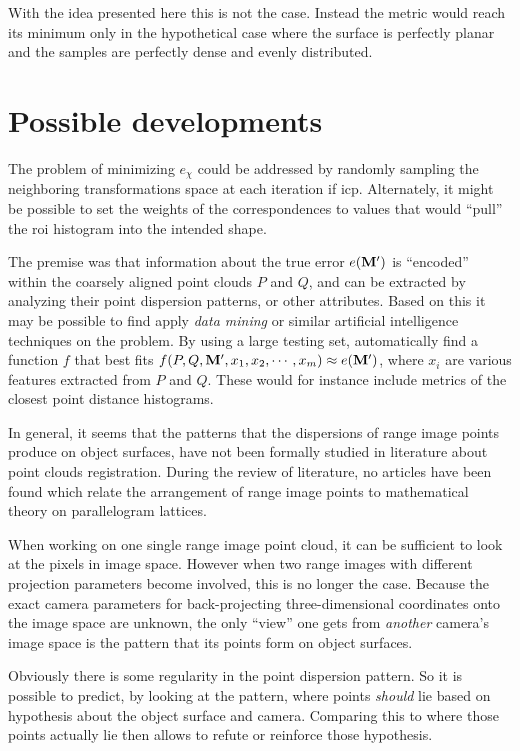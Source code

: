 With the idea presented here this is not the case. Instead the metric would reach its minimum only in the hypothetical case where the surface is perfectly planar and the samples are perfectly dense and evenly distributed.


\section{Possible developments}
The problem of minimizing $e_{\chi}$ could be addressed by randomly sampling the neighboring transformations space at each iteration if \gls{icp}. Alternately, it might be possible to set the weights of the correspondences to values that would ``pull'' the \gls{roi} histogram into the intended shape.

The premise was that information about the true error $e(\mathbf{M'})$ is ``encoded'' within the coarsely aligned point clouds $P$ and $Q$, and can be extracted by analyzing their point dispersion patterns, or other attributes. Based on this it may be possible to find apply \emph{data mining} or similar artificial intelligence techniques on the problem. By using a large testing set, automatically find a function $f$ that best fits $f(P, Q, \mathbf{M'}, x_1, x_2, \cdots, x_m) \approx e(\mathbf{M'})$, where $x_i$ are various features extracted from $P$ and $Q$. These would for instance include metrics of the closest point distance histograms.

In general, it seems that the patterns that the dispersions of range image points produce on object surfaces, have not been formally studied in literature about point clouds registration. During the review of literature, no articles have been found which relate the arrangement of range image points to mathematical theory on parallelogram lattices.

When working on one single range image point cloud, it can be sufficient to look at the pixels in image space. However when two range images with different projection parameters become involved, this is no longer the case. Because the exact camera parameters for back-projecting three-dimensional coordinates onto the image space are unknown, the only ``view'' one gets from \emph{another} camera's image space is the pattern that its points form on object surfaces.

Obviously there is some regularity in the point dispersion pattern. So it is possible to predict, by looking at the pattern, where points \emph{should} lie based on hypothesis about the object surface and camera. Comparing this to where those points actually lie then allows to refute or reinforce those hypothesis.

